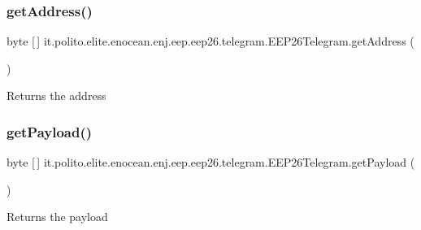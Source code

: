 \subsubsection{\texorpdfstring{get\+Address()}{getAddress()}}
{\footnotesize\ttfamily byte \mbox{[}$\,$\mbox{]} it.\+polito.\+elite.\+enocean.\+enj.\+eep.\+eep26.\+telegram.\+E\+E\+P26\+Telegram.\+get\+Address (\begin{DoxyParamCaption}{ }\end{DoxyParamCaption})}

\begin{DoxyReturn}{Returns}
the address 
\end{DoxyReturn}
\hypertarget{classit_1_1polito_1_1elite_1_1enocean_1_1enj_1_1eep_1_1eep26_1_1telegram_1_1_e_e_p26_telegram_ac43e7807ca27a9723419ce689d498f04}{}\label{classit_1_1polito_1_1elite_1_1enocean_1_1enj_1_1eep_1_1eep26_1_1telegram_1_1_e_e_p26_telegram_ac43e7807ca27a9723419ce689d498f04} 
\subsubsection{\texorpdfstring{get\+Payload()}{getPayload()}}
{\footnotesize\ttfamily byte \mbox{[}$\,$\mbox{]} it.\+polito.\+elite.\+enocean.\+enj.\+eep.\+eep26.\+telegram.\+E\+E\+P26\+Telegram.\+get\+Payload (\begin{DoxyParamCaption}{ }\end{DoxyParamCaption})}

\begin{DoxyReturn}{Returns}
the payload 
\end{DoxyReturn}
\hypertarget{classit_1_1polito_1_1elite_1_1enocean_1_1enj_1_1eep_1_1eep26_1_1telegram_1_1_e_e_p26_telegram_a4731d734e1d57640d5e3d704908f29d5}{}\label{classit_1_1polito_1_1elite_1_1enocean_1_1enj_1_1eep_1_1eep26_1_1telegram_1_1_e_e_p26_telegram_a4731d734e1d57640d5e3d704908f29d5} 
